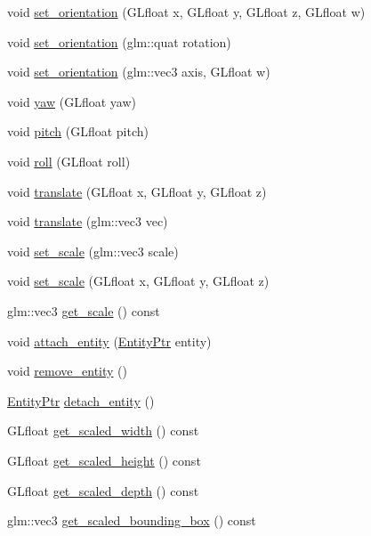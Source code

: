 \begin{DoxyCompactItemize}
\item 
void \hyperlink{classLarp_1_1Node_ad1b12b56ba7c708d1ce51ec0762f7476}{set\+\_\+orientation} (G\+Lfloat x, G\+Lfloat y, G\+Lfloat z, G\+Lfloat w)
\item 
void \hyperlink{classLarp_1_1Node_a3695bdfa48908be007d751e9c05bdb0e}{set\+\_\+orientation} (glm\+::quat rotation)
\item 
void \hyperlink{classLarp_1_1Node_a0d5e761af674c2c547e8638b91a2a85b}{set\+\_\+orientation} (glm\+::vec3 axis, G\+Lfloat w)
\item 
void \hyperlink{classLarp_1_1Node_a829a3cf29a5f165f7d771cc283f25053}{yaw} (G\+Lfloat yaw)
\item 
void \hyperlink{classLarp_1_1Node_ad8f8390e764a96398d080538c437c7ee}{pitch} (G\+Lfloat pitch)
\item 
void \hyperlink{classLarp_1_1Node_a1c839a3075f1e97aa368ba8212c50ee7}{roll} (G\+Lfloat roll)
\item 
void \hyperlink{classLarp_1_1Node_aa0186c5d77b58e2d7ede02dec0f2cdc4}{translate} (G\+Lfloat x, G\+Lfloat y, G\+Lfloat z)
\item 
void \hyperlink{classLarp_1_1Node_a7494be4e04c8f5911aedeeb41c27993b}{translate} (glm\+::vec3 vec)
\item 
void \hyperlink{classLarp_1_1Node_a20048e6f1487b9e6bdb5e2f66794de65}{set\+\_\+scale} (glm\+::vec3 scale)
\item 
void \hyperlink{classLarp_1_1Node_aa212fa28bc6cc6df4ded2a487fd591eb}{set\+\_\+scale} (G\+Lfloat x, G\+Lfloat y, G\+Lfloat z)
\item 
glm\+::vec3 \hyperlink{classLarp_1_1Node_a396cac721eb4a2cb46b14fc63f71ae8c}{get\+\_\+scale} () const 
\item 
void \hyperlink{classLarp_1_1Node_a2525a02b9ad2bd24e4d2a4338cd9a8e1}{attach\+\_\+entity} (\hyperlink{namespaceLarp_a775efcc4cabb308d50168c52df343353}{Entity\+Ptr} entity)
\item 
void \hyperlink{classLarp_1_1Node_a390c52314f7cb0f27244994aba34dc10}{remove\+\_\+entity} ()
\item 
\hyperlink{namespaceLarp_a775efcc4cabb308d50168c52df343353}{Entity\+Ptr} \hyperlink{classLarp_1_1Node_af32ccf64d85fa71079fa4755648f620f}{detach\+\_\+entity} ()
\item 
G\+Lfloat \hyperlink{classLarp_1_1Node_a95cf3fbe1ec65bca7a90d6ef13c2e6af}{get\+\_\+scaled\+\_\+width} () const 
\item 
G\+Lfloat \hyperlink{classLarp_1_1Node_aae8201315932cad238f72bfea116e12f}{get\+\_\+scaled\+\_\+height} () const 
\item 
G\+Lfloat \hyperlink{classLarp_1_1Node_a296b152b7e35bbbd64a91b5533087e41}{get\+\_\+scaled\+\_\+depth} () const 
\item 
glm\+::vec3 \hyperlink{classLarp_1_1Node_a3f83d9b01243b4a9ec4402be16f16333}{get\+\_\+scaled\+\_\+bounding\+\_\+box} () const 
\end{DoxyCompactItemize}
